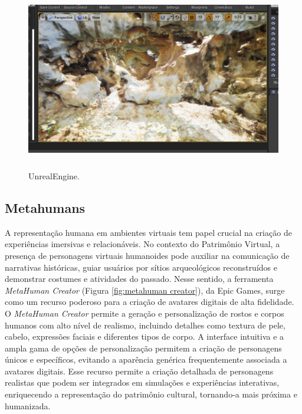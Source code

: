 \begin{figure}[H]
    \centering
    \includegraphics[height=8cm, keepaspectratio]{img/unreal-print2.png}
    \caption{UnrealEngine.}
    \label{fig:unreal-print2}
\end{figure}
\subsection{Metahumans}

A representação humana em ambientes virtuais tem papel crucial na criação de experiências imersivas e relacionáveis. No contexto do Patrimônio Virtual, a presença de personagens virtuais humanoides pode auxiliar na comunicação de narrativas históricas, guiar usuários por sítios arqueológicos reconstruídos e demonstrar costumes e atividades do passado. Nesse sentido, a ferramenta \textit{MetaHuman Creator} (Figura \ref{fig:metahuman creator}), da Epic Games, surge como um recurso poderoso para a criação de avatares digitais de alta fidelidade.
O \textit{MetaHuman Creator} permite a geração e personalização de rostos e corpos humanos com alto nível de realismo, incluindo detalhes como textura de pele, cabelo, expressões faciais e diferentes tipos de corpo. A interface intuitiva e a ampla gama de opções de personalização permitem a criação de personagens únicos e específicos, evitando a aparência genérica frequentemente associada a avatares digitais. Esse recurso permite a criação detalhada de personagens realistas que podem ser integrados em simulações e experiências interativas, enriquecendo a representação do patrimônio cultural, tornando-a mais próxima e humanizada.

